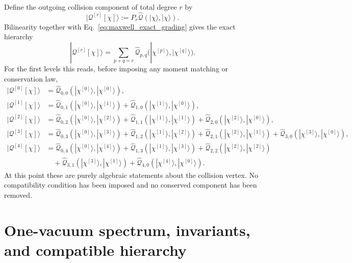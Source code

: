\documentclass[11pt,oneside]{article}
\numberwithin{equation}{section}
\theoremstyle{definition}
\begin{document}
Define the outgoing collision component of total degree $r$ by
\begin{equation}
|\mathcal Q^{[r]}[\chi]\rangle
:=
P_r\widehat{\mathcal Q}(|\chi\rangle,|\chi\rangle).
\label{eq:maxwell_collision_output_level_def}
\end{equation}
Bilinearity together with Eq.~\eqref{eq:maxwell_exact_grading} gives the exact hierarchy
\begin{equation}
|\mathcal Q^{[r]}[\chi]\rangle
=
\sum_{p+q=r}
\widehat{\mathcal Q}_{p,q}
\big(|\chi^{[p]}\rangle,|\chi^{[q]}\rangle\big).
\label{eq:maxwell_graded_hierarchy}
\end{equation}
For the first levels this reads, before imposing any moment matching or conservation law,
\begin{align}
|\mathcal Q^{[0]}[\chi]\rangle
&=\widehat{\mathcal Q}_{0,0}(|\chi^{[0]}\rangle,|\chi^{[0]}\rangle),
\\
|\mathcal Q^{[1]}[\chi]\rangle
&=\widehat{\mathcal Q}_{0,1}(|\chi^{[0]}\rangle,|\chi^{[1]}\rangle)
 +\widehat{\mathcal Q}_{1,0}(|\chi^{[1]}\rangle,|\chi^{[0]}\rangle),
\\
|\mathcal Q^{[2]}[\chi]\rangle
&=\widehat{\mathcal Q}_{0,2}(|\chi^{[0]}\rangle,|\chi^{[2]}\rangle)
 +\widehat{\mathcal Q}_{1,1}(|\chi^{[1]}\rangle,|\chi^{[1]}\rangle)
 +\widehat{\mathcal Q}_{2,0}(|\chi^{[2]}\rangle,|\chi^{[0]}\rangle),
\\
|\mathcal Q^{[3]}[\chi]\rangle
&=\widehat{\mathcal Q}_{0,3}(|\chi^{[0]}\rangle,|\chi^{[3]}\rangle)
 +\widehat{\mathcal Q}_{1,2}(|\chi^{[1]}\rangle,|\chi^{[2]}\rangle)
 +\widehat{\mathcal Q}_{2,1}(|\chi^{[2]}\rangle,|\chi^{[1]}\rangle)
 +\widehat{\mathcal Q}_{3,0}(|\chi^{[3]}\rangle,|\chi^{[0]}\rangle),
\\
|\mathcal Q^{[4]}[\chi]\rangle
&=\widehat{\mathcal Q}_{0,4}(|\chi^{[0]}\rangle,|\chi^{[4]}\rangle)
 +\widehat{\mathcal Q}_{1,3}(|\chi^{[1]}\rangle,|\chi^{[3]}\rangle)
 +\widehat{\mathcal Q}_{2,2}(|\chi^{[2]}\rangle,|\chi^{[2]}\rangle)
\nonumber\\
&\quad
 +\widehat{\mathcal Q}_{3,1}(|\chi^{[3]}\rangle,|\chi^{[1]}\rangle)
 +\widehat{\mathcal Q}_{4,0}(|\chi^{[4]}\rangle,|\chi^{[0]}\rangle).
\label{eq:maxwell_first_levels_unreduced}
\end{align}
At this point these are purely algebraic statements about the collision vertex.  No compatibility condition has been imposed and no conserved component has been removed.

\section{One-vacuum spectrum, invariants, and compatible hierarchy}
\label{subsec:maxwell_linearized_spectrum}
\end{document}

